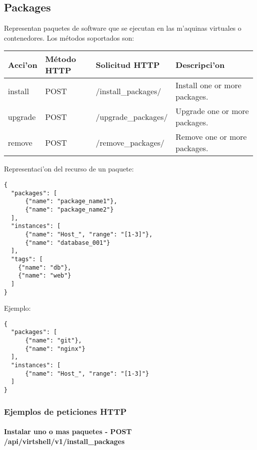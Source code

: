\subsection{Packages}
Representan paquetes de software que se ejecutan en las m'aquinas virtuales o contenedores. Los métodos soportados son:

\begin{center}
 \begin{tabular}{| l | l | l | l |}
 \hline
  \rowcolor{blueapi}
  \textbf{Acci'on} & \textbf{Método HTTP} & \textbf{Solicitud HTTP} & \textbf{Descripci'on} \\ [0.5ex] 
  \hline\hline
  install & POST & /install\_packages/ & Install one or more packages. \\
  \hline
  upgrade & POST & /upgrade\_packages/ & Upgrade one or more packages. \\
  \hline
  remove & POST & /remove\_packages/ & Remove one or more packages. \\ [1ex] 
  \hline
\end{tabular}
\end{center}

\vspace{1cm}
Representaci'on del recurso de un paquete:
\vspace{1cm}

\begin{lstlisting}[style=json]
{
  "packages": [
      {"name": "package_name1"},
      {"name": "package_name2"}
  ],
  "instances": [ 
      {"name": "Host_", "range": "[1-3]"}, 
      {"name": "database_001"}
  ],
  "tags": [
    {"name": "db"},
    {"name": "web"}
  ]
}
\end{lstlisting}

Ejemplo:

\medskip
\begin{lstlisting}[style=json]
{
  "packages": [
      {"name": "git"},
      {"name": "nginx"}
  ],
  "instances": [ 
      {"name": "Host_", "range": "[1-3]"}
  ]
}
\end{lstlisting}

\subsubsection{Ejemplos de peticiones HTTP}

\paragraph{Instalar uno o mas paquetes - POST \\ /api/virtshell/v1/install\_packages} ~\\

